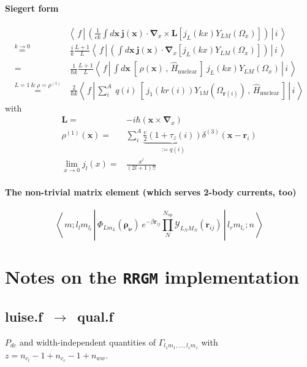 \documentclass[onecolumn,preprint,superscriptaddress,nofootinbib,notitlepage,10pt,linenumbers]{revtex4-1}
\newcommand{\be}{\begin{equation}}
\newcommand{\ee}{\end{equation}}
\newcommand{\la}{\label}
\newcommand{\ve}[1]{\ensuremath{\boldsymbol{#1}}}
\newcommand{\me}[3] {\left\langle\,#1\,\left|\left.\,#2\,\right|\,#3\,\right.\right\rangle}
\begin{document}
\paragraph{Siegert form}
\begin{align}\la{eq.siegert}
&\me{f}{\left(\frac{1}{ck}\int d\ve{x}~\ve{j}(\ve{x})\cdot\ve{\nabla}_x\times\ve{L}\left[j_L(kx)Y_{LM}(\Omega_x)\right]\right)}{i}
\\[1em]
\overset{\scriptstyle k\to 0}{=}&~\frac{i}{k}\frac{L+1}{L}\me{f}{\left(\int d\ve{x}~\ve{j}(\ve{x})\cdot\ve{\nabla}_x\left[j_L(kx)Y_{LM}(\Omega_x)\right]\right)}{i}
\\[1em]
=&~\frac{1}{\hbar k}\frac{L+1}{L}\me{f}{\int d\ve{x}~\left[\,\rho(\ve{x})\,,\,\hat{H}_\text{nuclear}\,\right]~j_L(kx)Y_{LM}(\Omega_x)}{i}\\[1em]
\overset{\scriptstyle L=1~\&~\rho=\rho^{(1)}}{=}&~\frac{2}{\hbar k}\me{f}{\sum\limits_i^A~q(i)~\left[\,j_1(kr(i))Y_{1M}(\Omega_{\ve{r}(i)})\,,\,\hat{H}_\text{nuclear}\,\right]}{i}
\end{align}
with
\begin{align}\la{eq.siegert.descr}
\ve{L}=&-i\hbar\left(\ve{x}\times\ve{\nabla}_x\right)\\
\rho^{(1)}(\ve{x})=&\sum\limits_i^A\underbrace{\frac{e}{2}(1+\tau_z(i))}_{:=q(i)}\delta^{(3)}(\ve{x}-\ve{r}_i)\\
\lim\limits_{x\to 0}j_l(x)=&\frac{x^l}{(2l+1)!!}
\end{align}

\paragraph{The non-trivial matrix element (which serves {\bf 2-body} currents, too)}
\be\la{eq.theme}
\me{m;l_lm_{l_l}}{\Phi_{Lm_L}(\ve{\rho_\nu})~e^{-\beta\ve{r}_{ij}}\prod\limits_{N}^{N_{\text{op}}}\mathcal{Y}_{L_NM_N}(\ve{r}_{ij})}{l_rm_{l_r};n}
\ee


\section{Notes on the \texttt{RRGM} implementation}



\subsection*{luise.f~$\to$~qual.f}
$P_{dc}$ and width-independent quantities of $\Gamma_{l_1m_1,\ldots,l_zm_z}$ with
$z=n_{c_l}-1+n_{c_r}-1+n_{ww}$.
\end{document}
